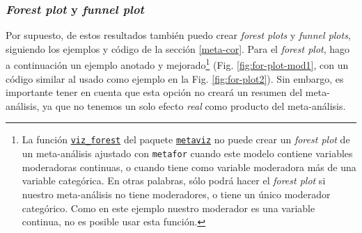 \documentclass[
  bookmarksnumbered]{article}
\begin{document}
\hypertarget{plot-mod}{%
\subsubsection{\texorpdfstring{\emph{Forest plot} y \emph{funnel plot}}{Forest plot y funnel plot}}\label{plot-mod}}

Por supuesto, de estos resultados también puedo crear \emph{forest plots} y \emph{funnel plots}, siguiendo los ejemplos y código de la sección \ref{meta-cor}. Para el \emph{forest plot}, hago a continuación un ejemplo anotado y mejorado\footnote{La función \href{https://cran.r-project.org/web/packages/metaviz/vignettes/metaviz.html\#creating-forest-plots-with-function-viz_forest}{\texttt{viz\_forest}} del paquete \href{https://cran.r-project.org/web/packages/metaviz/vignettes/metaviz.html}{\texttt{metaviz}} no puede crear un \emph{forest plot} de un meta-análisis ajustado con \texttt{metafor} cuando este modelo contiene variables moderadoras continuas, o cuando tiene como variable moderadora más de una variable categórica. En otras palabras, sólo podrá hacer el \emph{forest plot} si nuestro meta-análisis no tiene moderadores, o tiene un único moderador categórico. Como en este ejemplo nuestro moderador es una variable continua, no es posible usar esta función.} (Fig. \ref{fig:for-plot-mod1}, con un código similar al usado como ejemplo en la Fig. \ref{fig:for-plot2}). Sin embargo, es importante tener en cuenta que esta opción no creará un resumen del meta-análisis, ya que no tenemos un solo efecto \emph{real} como producto del meta-análisis.
\end{document}

